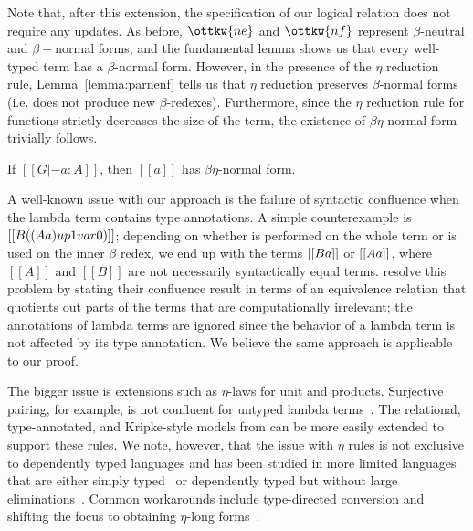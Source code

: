 \documentclass[acmsmall,screen=true,
\ifpublic review=false\else,review=true\fi
  ,anonymous=\ifanonymous true\else false\fi]{acmart}
\begin{document}
Note that, after this extension, the specification of our logical relation does not require
any updates. As before, $\ottkw{ne}$ and $\ottkw{nf}$
represent $\beta$-neutral and $\beta-$normal forms, and the
fundamental lemma shows us that every well-typed term has a
$\beta$-normal form. However, in the presence of the $\eta$ reduction
rule, Lemma~\ref{lemma:parnenf} tells us that $\eta$ reduction
preserves $\beta$-normal forms (i.e. does not produce new
$\beta$-redexes). Furthermore, since the $\eta$ reduction rule for
functions strictly decreases the size of the term, the existence of
$\beta\eta$ normal form trivially follows.
\begin{corollary}
\label{corollary:exbetaeta}
If $[[G |- a : A]]$, then $[[a]]$ has $\beta\eta$-normal form.
\end{corollary}

A well-known issue with our approach is the failure of syntactic
confluence when the lambda term contains type annotations. A simple
counterexample is $[[\- B ((\- A a) {up 1} var 0)]]$; depending on
whether  is performed on the whole term or
 is used on the inner $\beta$ redex, we end up with the
terms $[[\- B a]]$ or $[[\- A a]]$, where $[[A]]$ and $[[B]]$ are not
necessarily syntactically equal terms. \citet{choudhury:ddc} resolve
this problem by stating their confluence result in terms of an
equivalence relation that quotients out parts of the terms that are
computationally irrelevant; the annotations of lambda terms are
ignored since the behavior of a lambda term is not affected by its
type annotation. We believe the same approach is applicable to our
proof.

The bigger issue is extensions such as $\eta$-laws for unit and
products. Surjective pairing, for example, is not confluent for untyped lambda
terms~\cite{KLOP198997}. The relational, type-annotated, and Kripke-style models from
\citet{nbeincoq,decagda,martin-lof-a-la-coq} can be more easily
extended to support these rules.
We note, however, that the issue with $\eta$ rules is not exclusive to dependently
typed languages and has been studied in more limited languages that
are either simply
typed~\citep{pierce2004advanced,pfenning1997computation} or
dependently typed but without large
eliminations~\citep{harper2005equivalence,
abel2005untypedconvsurjective}. Common workarounds include
type-directed conversion and shifting the focus to obtaining
$\eta$-long forms~\cite{Abel12}.
\end{document}
